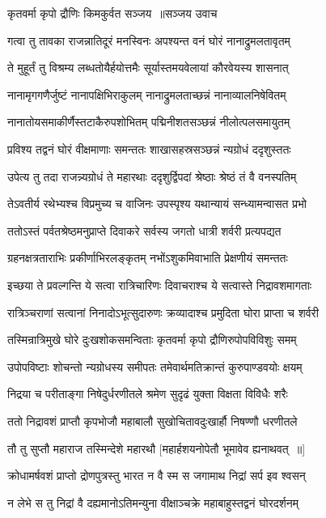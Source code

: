 \twolineshloka
{कृतवर्मा कृपो द्रौणिः किमकुर्वत सञ्जय ॥सञ्जय उवाच}
{}


\twolineshloka
{गत्वा तु तावका राजन्नातिदूरं मनस्विनः}
{अपश्यन्त वनं घोरं नानाद्रुमलतावृतम्}


\twolineshloka
{ते मुहूर्तं तु विश्रम्य लब्धतोयैर्हयोत्तमैः}
{सूर्यास्तमयवेलायां कौरवेयस्य शासनात्}


\twolineshloka
{नानामृगगणैर्जुष्टं नानापक्षिभिराकुलम्}
{नानाद्रुमलताच्छन्नं नानाव्यालनिषेवितम्}


\twolineshloka
{नानातोयसमाकीर्णैस्तटाकैरुपशोभितम्}
{पद्मिनीशतसञ्छन्नं नीलोत्पलसमायुतम्}


\twolineshloka
{प्रविश्य तद्वनं घोरं वीक्षमाणाः समन्ततः}
{शाखासहस्रसञ्छन्नं न्यग्रोधं ददृशुस्ततः}


\twolineshloka
{उपेत्य तु तदा राजन्न्यग्रोधं ते महारथाः}
{ददृशुर्द्विपदां श्रेष्ठाः श्रेष्ठं तं वै वनस्पतिम्}


\twolineshloka
{तेऽवतीर्य रथेभ्यश्च विप्रमुच्य च वाजिनः}
{उपस्पृश्य यथान्यायं सन्ध्यामन्वासत प्रभो}


\twolineshloka
{ततोऽस्तं पर्वतश्रेष्ठमनुप्राप्ते दिवाकरे}
{सर्वस्य जगतो धात्री शर्वरी प्रत्यपद्यत}


\twolineshloka
{ग्रहनक्षत्रताराभिः प्रकीर्णाभिरलङ्कृतम्}
{नभोंऽशुकमिवाभाति प्रेक्षणीयं समन्ततः}


\twolineshloka
{इच्छया ते प्रवल्गन्ति ये सत्वा रात्रिचारिणः}
{दिवाचराश्च ये सत्वास्ते निद्रावशमागताः}


\twolineshloka
{रात्रिञ्चराणां सत्वानां निनादोऽभूत्सुदारुणः}
{क्रव्यादाश्च प्रमुदिता घोरा प्राप्ता च शर्वरी}


\twolineshloka
{तस्मिन्रात्रिमुखे घोरे दुःखशोकसमन्विताः}
{कृतवर्मा कृपो द्रौणिरुपोपविविशुः समम्}


\twolineshloka
{उपोपविष्टाः शोचन्तो न्यग्रोधस्य समीपतः}
{तमेवार्थमतिक्रान्तं कुरुपाण्डवयोः क्षयम्}


\twolineshloka
{निद्रया च परीताङ्गा निषेदुर्धरणीतले}
{श्रमेण सुदृढं युक्ता विक्षता विविधैः शरैः}


\twolineshloka
{ततो निद्रावशं प्राप्तौ कृपभोजौ महाबालौ}
{सुखोचितावदुःखार्हौ निषण्णौ धरणीतले}


\twolineshloka
{तौ तु सुप्तौ महाराज तस्मिन्देशे महारथौ}
{[महार्हशयनोपेतौ भूमावेव ह्यनाथवत् ॥]}


\twolineshloka
{क्रोधामर्षवशं प्राप्तो द्रोणपुत्रस्तु भारत}
{न वै स्म स जगामाथ निद्रां सर्प इव श्वसन्}


\twolineshloka
{न लेभे स तु निद्रां वै दह्यमानोऽतिमन्युना}
{वीक्षाञ्चक्रे महाबाहुस्तद्वनं घोरदर्शनम्}


